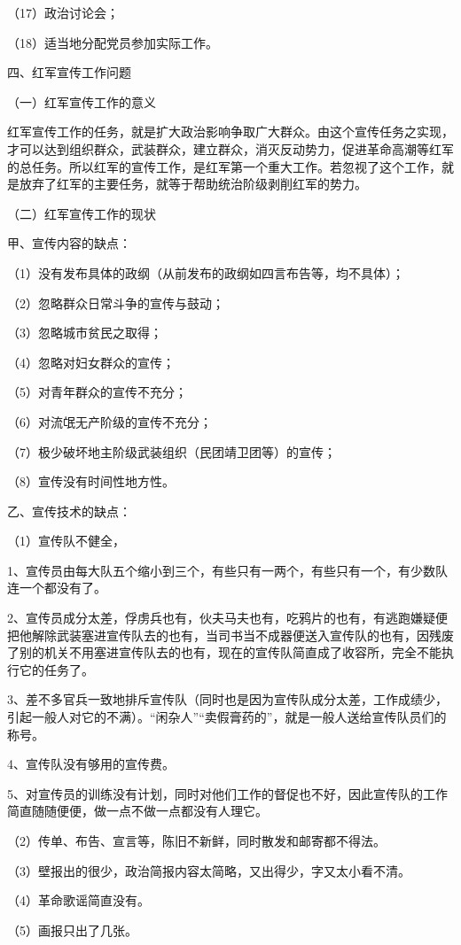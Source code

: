 （17）政治讨论会；

（18）适当地分配党员参加实际工作。

四、红军宣传工作问题

（一）红军宣传工作的意义

红军宣传工作的任务，就是扩大政治影响争取广大群众。由这个宣传任务之实现，才可以达到组织群众，武装群众，建立群众，消灭反动势力，促进革命高潮等红军的总任务。所以红军的宣传工作，是红军第一个重大工作。若忽视了这个工作，就是放弃了红军的主要任务，就等于帮助统治阶级剥削红军的势力。

（二）红军宣传工作的现状

甲、宣传内容的缺点：

（1）没有发布具体的政纲（从前发布的政纲如四言布告等，均不具体）；

（2）忽略群众日常斗争的宣传与鼓动；

（3）忽略城市贫民之取得；

（4）忽略对妇女群众的宣传；

（5）对青年群众的宣传不充分；

（6）对流氓无产阶级的宣传不充分；

（7）极少破坏地主阶级武装组织（民团靖卫团等）的宣传；

（8）宣传没有时间性地方性。

乙、宣传技术的缺点：

（1）宣传队不健全，

1、宣传员由每大队五个缩小到三个，有些只有一两个，有些只有一个，有少数队连一个都没有了。

2、宣传员成分太差，俘虏兵也有，伙夫马夫也有，吃鸦片的也有，有逃跑嫌疑便把他解除武装塞进宣传队去的也有，当司书当不成器便送入宣传队的也有，因残废了别的机关不用塞进宣传队去的也有，现在的宣传队简直成了收容所，完全不能执行它的任务了。

3、差不多官兵一致地排斥宣传队（同时也是因为宣传队成分太差，工作成绩少，引起一般人对它的不满）。“闲杂人”“卖假膏药的”，就是一般人送给宣传队员们的称号。

4、宣传队没有够用的宣传费。

5、对宣传员的训练没有计划，同时对他们工作的督促也不好，因此宣传队的工作简直随随便便，做一点不做一点都没有人理它。

（2）传单、布告、宣言等，陈旧不新鲜，同时散发和邮寄都不得法。

（3）壁报出的很少，政治简报内容太简略，又出得少，字又太小看不清。

（4）革命歌谣简直没有。

（5）画报只出了几张。


